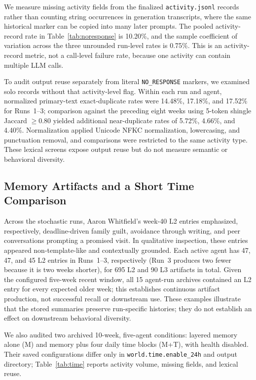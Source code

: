 \documentclass[11pt]{article}
\begin{document}
We measure missing activity fields from the finalized \texttt{activity.jsonl} records rather than counting string occurrences in generation transcripts, where the same historical marker can be copied into many later prompts.
The pooled activity-record rate in Table~\ref{tab:noresponse} is 10.20\%, and the sample coefficient of variation across the three unrounded run-level rates is 0.75\%.
This is an activity-record metric, not a call-level failure rate, because one activity can contain multiple LLM calls.

To audit output reuse separately from literal \texttt{NO\_RESPONSE} markers, we examined solo records without that activity-level flag.
Within each run and agent, normalized primary-text exact-duplicate rates were 14.48\%, 17.18\%, and 17.52\% for Runs~1--3; comparison against the preceding eight weeks using 5-token shingle Jaccard $\geq 0.80$ yielded additional near-duplicate rates of 5.72\%, 4.66\%, and 4.40\%.
Normalization applied Unicode NFKC normalization, lowercasing, and punctuation removal, and comparisons were restricted to the same activity type.
These lexical screens expose output reuse but do not measure semantic or behavioral diversity.

\subsection{Memory Artifacts and a Short Time Comparison}

Across the stochastic runs, Aaron Whitfield's week-40 L2 entries emphasized, respectively, deadline-driven family guilt, avoidance through writing, and peer conversations prompting a promised visit.
In qualitative inspection, these entries appeared non-template-like and contextually grounded.
Each active agent has 47, 47, and 45 L2 entries in Runs~1--3, respectively (Run~3 produces two fewer because it is two weeks shorter), for 695 L2 and 90 L3 artifacts in total.
Given the configured five-week recent window, all 15 agent-run archives contained an L2 entry for every expected older week; this establishes continuous artifact production, not successful recall or downstream use.
These examples illustrate that the stored summaries preserve run-specific histories; they do not establish an effect on downstream behavioral diversity.

We also audited two archived 10-week, five-agent conditions: layered memory alone (M) and memory plus four daily time blocks (M+T), with health disabled.
Their saved configurations differ only in \texttt{world.time.enable\_24h} and output directory; Table~\ref{tab:time} reports activity volume, missing fields, and lexical reuse.
\end{document}
